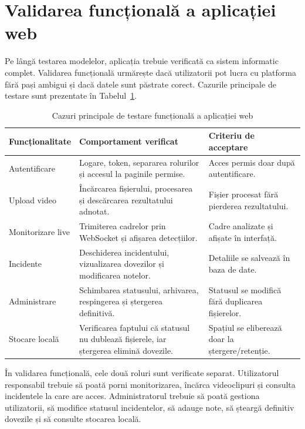 \section{Validarea funcțională a aplicației web}

Pe lângă testarea modelelor, aplicația trebuie verificată ca sistem informatic complet. Validarea funcțională urmărește dacă utilizatorii pot lucra cu platforma fără pași ambigui și dacă datele sunt păstrate corect. Cazurile principale de testare sunt prezentate în Tabelul~\ref{tab:testare-web}.

\begin{table}[!htbp]
\centering
\begingroup
\small
{}
\renewcommand{\arraystretch}{1.08}
\setlength{\tabcolsep}{4pt}
\begin{tabular}{|>{\raggedright\arraybackslash}p{3.15cm}|>{\raggedright\arraybackslash}p{6.45cm}|>{\raggedright\arraybackslash}p{3.9cm}|}
\hline
\textbf{Funcționalitate} & \textbf{Comportament verificat} & \textbf{Criteriu de acceptare} \\
\hline
Autentificare & Logare, token, separarea rolurilor și accesul la paginile permise. & Acces permis doar după autentificare. \\
\hline
Upload video & Încărcarea fișierului, procesarea și descărcarea rezultatului adnotat. & Fișier procesat fără pierderea rezultatului. \\
\hline
Monitorizare live & Trimiterea cadrelor prin WebSocket și afișarea detecțiilor. & Cadre analizate și afișate în interfață. \\
\hline
Incidente & Deschiderea incidentului, vizualizarea dovezilor și modificarea notelor. & Detaliile se salvează în baza de date. \\
\hline
Administrare & Schimbarea statusului, arhivarea, respingerea și ștergerea definitivă. & Statusul se modifică fără duplicarea fișierelor. \\
\hline
Stocare locală & Verificarea faptului că statusul nu dublează fișierele, iar ștergerea elimină dovezile. & Spațiul se eliberează doar la ștergere/retenție. \\
\hline
\end{tabular}
\endgroup
\caption{Cazuri principale de testare funcțională a aplicației web}
\label{tab:testare-web}
\end{table}

În validarea funcțională, cele două roluri sunt verificate separat. Utilizatorul responsabil trebuie să poată porni monitorizarea, încărca videoclipuri și consulta incidentele la care are acces. Administratorul trebuie să poată gestiona utilizatorii, să modifice statusul incidentelor, să adauge note, să șteargă definitiv dovezile și să consulte stocarea locală.

